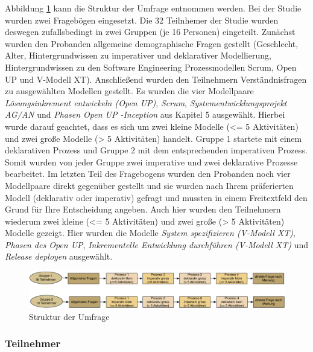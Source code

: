 Abbildung \ref{fig:UmfrageStruktur} kann die Struktur der Umfrage entnommen werden.
Bei der Studie wurden zwei Fragebögen eingesetzt. Die 32 Teilnhemer der Studie wurden deswegen zufallsbedingt in zwei Gruppen (je 16 Personen) eingeteilt. Zunächst wurden den Probanden allgemeine demographische Fragen gestellt (Geschlecht, Alter, Hintergrundwissen zu imperativer und deklarativer Modellierung, Hintergrundwissen zu den Software Engineering Prozessmodellen Scrum, Open UP und V-Modell XT).\newline
Anschließend wurden den Teilnehmern Verständnisfragen zu ausgewählten Modellen gestellt.
Es wurden die vier  Modellpaare \textit{Lösungsinkrement entwickeln (Open UP)}, \textit{Scrum}, \textit{Systementwicklungsprojekt AG/AN} und \textit{Phasen Open UP -Inception}  aus Kapitel 5 ausgewählt. Hierbei wurde darauf geachtet, dass es sich um zwei kleine Modelle (<= 5 Aktivitäten) und zwei große Modelle (> 5 Aktivitäten) handelt. Gruppe 1 startete mit einem deklarativen Prozess und Gruppe 2 mit dem entsprechenden imperativen Prozess. Somit wurden von jeder Gruppe zwei imperative und zwei deklarative Prozesse bearbeitet.  \newline
Im letzten Teil des Fragebogens wurden den Probanden noch vier Modellpaare direkt gegenüber gestellt und sie wurden nach Ihrem präferierten Modell (deklarativ oder imperativ) gefragt und mussten in einem Freitextfeld den Grund für Ihre Entscheidung angeben. Auch hier wurden den Teilnehmern wiederum zwei kleine (<= 5 Aktivitäten) und zwei große (> 5 Aktivitäten)  Modelle gezeigt. Hier wurden die Modelle \textit{System spezifizieren (V-Modell XT)}, \textit{Phasen des Open UP}, \textit{Inkrementelle Entwicklung durchführen (V-Modell XT)} und \textit{Release deployen} ausgewählt. \newline
\begin{figure}[htp]
\begin{center}
  \includegraphics [width=\textwidth]{UmfrageStruktur} %
  \caption{Struktur der Umfrage}
  \label{fig:UmfrageStruktur}
\end{center}
\end{figure}

\subsubsection{Teilnehmer}

